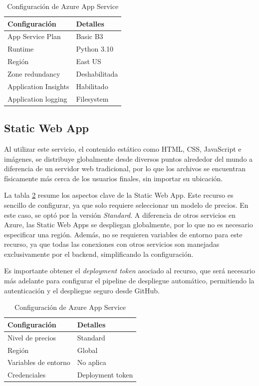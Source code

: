 \begin{table}[h]
	\centering
	\caption[Configuración de Azure App Service]{Configuración de Azure App Service}
	\begin{tabular}{l l}    
		\toprule
		\textbf{Configuración} & \textbf{Detalles} 	\\
		\midrule
		App Service Plan       & Basic B3           \\
		Runtime                & Python 3.10        \\
		Región                 & East US 			\\		
		Zone redundancy        & Deshabilitada		\\
		Application Insights   & Habilitado         \\
		Application logging	   & Filesystem			\\
		\bottomrule
		\hline
	\end{tabular}
	\label{tab:config-app-service}
\end{table}

\subsection{Static Web App}

Al utilizar este servicio, el contenido estático como HTML, CSS, JavaScript e imágenes, se distribuye globalmente desde diversos puntos 
alrededor del mundo a diferencia de un servidor web tradicional, por lo que los archivos se encuentran físicamente más cerca de los usuarios finales,
sin importar su ubicación.

La tabla \ref{tab:config-static-webapp} resume los aspectos clave de la Static Web App. Este recurso es sencillo de configurar, ya que solo requiere seleccionar un modelo de precios. En este caso, se optó por 
la versión \textit{Standard}. A diferencia de otros servicios en Azure, las Static Web Apps se despliegan globalmente, por lo que no es necesario especificar una región. 
Además, no se requieren variables de entorno para este recurso, ya que todas las conexiones con otros servicios son manejadas exclusivamente 
por el backend, simplificando la configuración.

Es importante obtener el \textit{deployment token} asociado al recurso, que será necesario más adelante para configurar el pipeline de despliegue automático, 
permitiendo la autenticación y el despliegue seguro desde GitHub.

\begin{table}[h]
	\centering
	\caption[Configuración de Azure App Service]{Configuración de Azure App Service}
	\begin{tabular}{l l}    
		\toprule
		\textbf{Configuración} 	& \textbf{Detalles} \\
		\midrule
		Nivel de precios        & Standard          \\
		Región                  & Global 			\\		
		Variables de entorno    & No aplica			\\
		Credenciales            & Deployment token  \\
		\bottomrule
		\hline
	\end{tabular}
	\label{tab:config-static-webapp}
\end{table}

